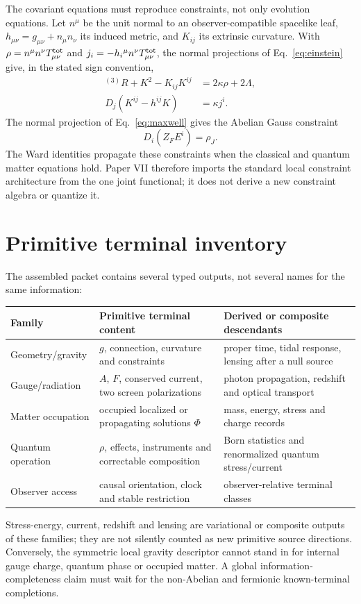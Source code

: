 The covariant equations must reproduce constraints, not only evolution
equations. Let $n^\mu$ be the unit normal to an observer-compatible spacelike
leaf, $h_{\mu\nu}=g_{\mu\nu}+n_\mu n_\nu$ its induced metric, and $K_{ij}$ its
extrinsic curvature. With
$\rho=n^\mu n^\nu T^{\rm tot}_{\mu\nu}$ and
$j_i=-h_i{}^\mu n^\nu T^{\rm tot}_{\mu\nu}$, the normal projections of
Eq.~\eqref{eq:einstein} give, in the stated sign convention,
\begin{align}
{}^{(3)}R+K^2-K_{ij}K^{ij}&=2\kappa\rho+2\Lambda,
\label{eq:hamconstraint}\\
D_j(K^{ij}-h^{ij}K)&=\kappa j^i.
\label{eq:momconstraint}
\end{align}
The normal projection of Eq.~\eqref{eq:maxwell} gives the Abelian Gauss
constraint
\begin{equation}
D_i(Z_FE^i)=\rho_J.
\label{eq:gaussconstraint}
\end{equation}
The Ward identities propagate these constraints when the classical and
quantum matter equations hold. Paper VII therefore imports the standard local
constraint architecture from the one joint functional; it does not derive a
new constraint algebra or quantize it.

\section{Primitive terminal inventory}

The assembled packet contains several typed outputs, not several names for
the same information:
\begin{center}
\small
\begin{tabularx}{0.96\textwidth}{@{}p{}Xp{}@{}}
\toprule
Family & Primitive terminal content & Derived or composite descendants\\
\midrule
Geometry/gravity & $g$, connection, curvature and constraints & proper time,
tidal response, lensing after a null source\\
Gauge/radiation & $A$, $F$, conserved current, two screen polarizations &
photon propagation, redshift and optical transport\\
Matter occupation & occupied localized or propagating solutions $\Phi$ &
mass, energy, stress and charge records\\
Quantum operation & $\rho$, effects, instruments and correctable composition &
Born statistics and renormalized quantum stress/current\\
Observer access & causal orientation, clock and stable restriction &
observer-relative terminal classes\\
\bottomrule
\end{tabularx}
\end{center}
Stress-energy, current, redshift and lensing are variational or composite
outputs of these families; they are not silently counted as new primitive
source directions. Conversely, the symmetric local gravity descriptor cannot
stand in for internal gauge charge, quantum phase or occupied matter. A global
information-completeness claim must wait for the non-Abelian and fermionic
known-terminal completions.

